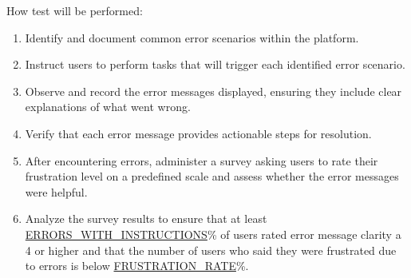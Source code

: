 \documentclass[12pt, titlepage]{article}
\begin{document}
\begin{enumerate}
How test will be performed:
\begin{enumerate}
    \item Identify and document common error scenarios within the platform.
    \item Instruct users to perform tasks that will trigger each identified error scenario.
    \item Observe and record the error messages displayed, ensuring they include clear explanations of what went wrong.
    \item Verify that each error message provides actionable steps for resolution.
    \item After encountering errors, administer a survey asking users to rate their frustration level on a predefined scale and assess whether the error messages were helpful.
    \item Analyze the survey results to ensure that at least \\ \hyperref[ERRORS_WITH_INSTRUCTIONS]{ERRORS\_WITH\_INSTRUCTIONS}\% of users rated error message clarity a 4 or higher and that the number of users who said they were frustrated due to errors is below \hyperref[FRUSTRATION_RATE]{FRUSTRATION\_RATE}\%.
\end{enumerate}


\end{enumerate}

\end{document}

